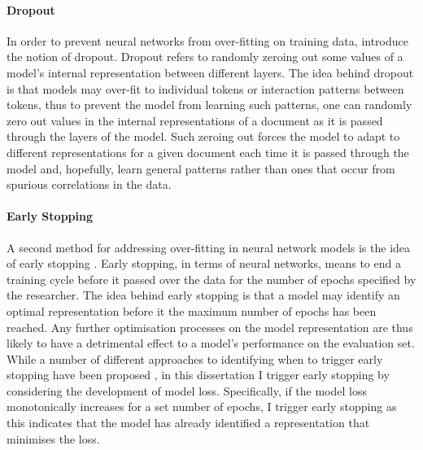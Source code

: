 \paragraph*{Dropout} In order to prevent neural networks from over-fitting on training data, \citet{Dropout paper} introduce the notion of dropout. Dropout refers to randomly zeroing out some values of a model's internal representation between different layers. The idea behind dropout is that models may over-fit to individual tokens or interaction patterns between tokens, thus to prevent the model from learning such patterns, one can randomly zero out values in the internal representations of a document as it is passed through the layers of the model.
Such zeroing out forces the model to adapt to different representations for a given document each time it is passed through the model and, hopefully, learn general patterns rather than ones that occur from spurious correlations in the data.

\paragraph*{Early Stopping} A second method for addressing over-fitting in neural network models is the idea of early stopping \citep{Early stopping papers}. Early stopping, in terms of neural networks, means to end a training cycle before it passed over the data for the number of epochs specified by the researcher. The idea behind early stopping is that a model may identify an optimal representation before it the maximum number of epochs has been reached. Any further optimisation processes on the model representation are thus likely to have a detrimental effect to a model's performance on the evaluation set.
While a number of different approaches to identifying when to trigger early stopping have been proposed \citep{early stopping papers}, in this dissertation I trigger early stopping by considering the development of model loss. Specifically, if the model loss monotonically increases for a set number of epochs, I trigger early stopping as this indicates that the model has already identified a representation that minimises the loss.

%
%
